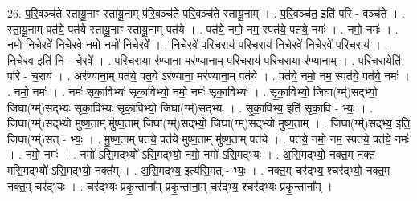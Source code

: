\documentclass[17pt]{extarticle}
\begin{document}
26. प॒रि॒वञ्च॑ते स्तायू॒नाꣳ स्ता॑यू॒नाम् प॑रि॒वञ्च॑ते परि॒वञ्च॑ते स्तायू॒नाम् । . प॒रि॒वञ्च॑त॒ इति॑ परि - वञ्च॑ते । . स्ता॒यू॒नाम् पत॑ये॒ पत॑ये स्तायू॒नाꣳ स्ता॑यू॒नाम् पत॑ये । . पत॑ये॒ नमो॒ नम॒ स्पत॑ये॒ पत॑ये॒ नमः॑ । . नमो॒ नमः॑ । . नमो॑ निचे॒रवे॑ निचे॒रवे॒ नमो॒ नमो॑ निचे॒रवे᳚ । . नि॒चे॒रवे॑ परिच॒राय॑ परिच॒राय॑ निचे॒रवे॑ निचे॒रवे॑ परिच॒राय॑ । . नि॒चे॒रव॒ इति॑ नि - चे॒रवे᳚ । . प॒रि॒च॒राया र॑ण्याना॒ मर॑ण्यानाम् परिच॒राय॑ परिच॒राया र॑ण्यानाम् । . प॒रि॒च॒रायेति॑ परि - च॒राय॑ । . अर॑ण्याना॒म् पत॑ये॒ पत॒ये ऽर॑ण्याना॒ मर॑ण्याना॒म् पत॑ये । . पत॑ये॒ नमो॒ नम॒ स्पत॑ये॒ पत॑ये॒ नमः॑ । . नमो॒ नमः॑ । . नमः॑ सृका॒विभ्यः॑ सृका॒विभ्यो॒ नमो॒ नमः॑ सृका॒विभ्यः॑ । . सृ॒का॒विभ्यो॒ जिघा(ग्म्॑)सद्भ्यो॒ जिघा(ग्म्॑)सद्भ्यः सृका॒विभ्यः॑ सृका॒विभ्यो॒ जिघा(ग्म्॑)सद्भ्यः । . सृ॒का॒विभ्य॒ इति॑ सृका॒वि - भ्यः॒ । . जिघा(ग्म्॑)सद्भ्यो मुष्ण॒ताम् मु॑ष्ण॒ताम् जिघा(ग्म्॑)सद्भ्यो॒ जिघा(ग्म्॑)सद्भ्यो मुष्ण॒ताम् । . जिघा(ग्म्॑)सद्भ्य॒ इति॒ जिघा(ग्म्॑)सत् - भ्यः॒ । . मु॒ष्ण॒ताम् पत॑ये॒ पत॑ये मुष्ण॒ताम् मु॑ष्ण॒ताम् पत॑ये । . पत॑ये॒ नमो॒ नम॒ स्पत॑ये॒ पत॑ये॒ नमः॑ । . नमो॒ नमः॑ । . नमो॑ ऽसि॒मद्भ्यो॑ ऽसि॒मद्भ्यो॒ नमो॒ नमो॑ ऽसि॒मद्भ्यः॑ । . अ॒सि॒मद्भ्यो॒ नक्त॒म् नक्त॑ मसि॒मद्भ्यो॑ ऽसि॒मद्भ्यो॒ नक्त᳚म् । . अ॒सि॒मद्भ्य॒ इत्य॑सि॒मत् - भ्यः॒ । . नक्त॒म् चर॑द्भ्य॒ श्चर॑द्भ्यो॒ नक्त॒म् नक्त॒म् चर॑द्भ्यः । . चर॑द्भ्यः प्रकृ॒न्ताना᳚म् प्रकृ॒न्ताना॒म् चर॑द्भ्य॒ श्चर॑द्भ्यः प्रकृ॒न्ताना᳚म् । \newline
\end{document}
